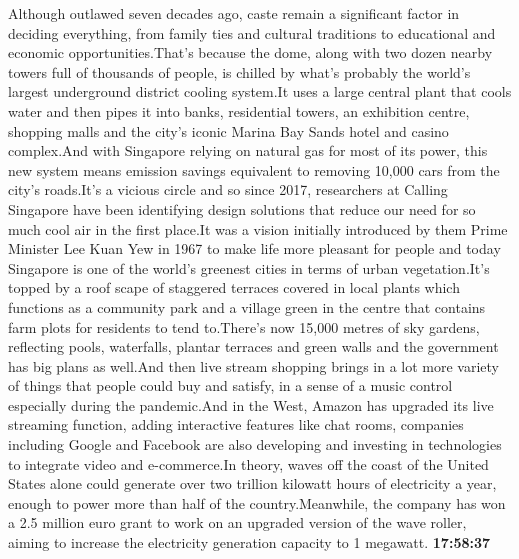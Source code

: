\documentclass{article}%
\begin{document}
Although outlawed seven decades ago, caste remain a significant factor in deciding everything, from family ties and cultural traditions to educational and economic opportunities.That's because the dome, along with two dozen nearby towers full of thousands of people, is chilled by what's probably the world's largest underground district cooling system.It uses a large central plant that cools water and then pipes it into banks, residential towers, an exhibition centre, shopping malls and the city's iconic Marina Bay Sands hotel and casino complex.And with Singapore relying on natural gas for most of its power, this new system means emission savings equivalent to removing 10,000 cars from the city's roads.It's a vicious circle and so since 2017, researchers at Calling Singapore have been identifying design solutions that reduce our need for so much cool air in the first place.It was a vision initially introduced by them Prime Minister Lee Kuan Yew in 1967 to make life more pleasant for people and today Singapore is one of the world's greenest cities in terms of urban vegetation.It's topped by a roof scape of staggered terraces covered in local plants which functions as a community park and a village green in the centre that contains farm plots for residents to tend to.There's now 15,000 metres of sky gardens, reflecting pools, waterfalls, plantar terraces and green walls and the government has big plans as well.And then live stream shopping brings in a lot more variety of things that people could buy and satisfy, in a sense of a music control especially during the pandemic.And in the West, Amazon has upgraded its live streaming function, adding interactive features like chat rooms, companies including Google and Facebook are also developing and investing in technologies to integrate video and e{-}commerce.In theory, waves off the coast of the United States alone could generate over two trillion kilowatt hours of electricity a year, enough to power more than half of the country.Meanwhile, the company has won a 2.5 million euro grant to work on an upgraded version of the wave roller, aiming to increase the electricity generation capacity to 1 megawatt.%
\textbf{17:58:37}%
\newline%
\end{document}
